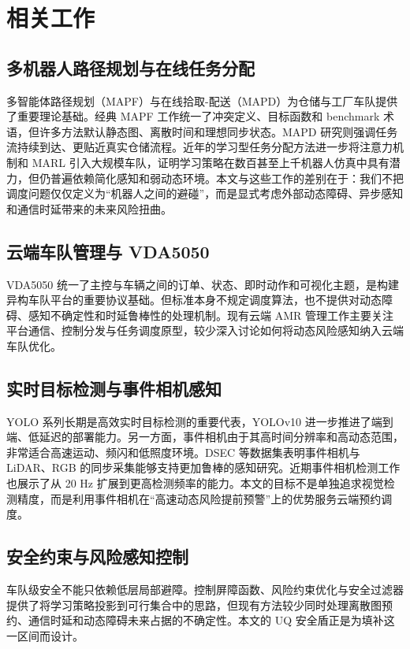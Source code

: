 \documentclass[UTF8,twocolumn,10pt]{ctexart}
\begin{document}
\section{相关工作}

\subsection{多机器人路径规划与在线任务分配}

多智能体路径规划（MAPF）与在线拾取-配送（MAPD）为仓储与工厂车队提供了重要理论基础。经典 MAPF 工作统一了冲突定义、目标函数和 benchmark 术语，但许多方法默认静态图、离散时间和理想同步状态。MAPD 研究则强调任务流持续到达、更贴近真实仓储流程。近年的学习型任务分配方法进一步将注意力机制和 MARL 引入大规模车队，证明学习策略在数百甚至上千机器人仿真中具有潜力，但仍普遍依赖简化感知和弱动态环境。本文与这些工作的差别在于：我们不把调度问题仅仅定义为“机器人之间的避碰”，而是显式考虑外部动态障碍、异步感知和通信时延带来的未来风险扭曲。

\subsection{云端车队管理与 VDA5050}

VDA5050 统一了主控与车辆之间的订单、状态、即时动作和可视化主题，是构建异构车队平台的重要协议基础。但标准本身不规定调度算法，也不提供对动态障碍、感知不确定性和时延鲁棒性的处理机制。现有云端 AMR 管理工作主要关注平台通信、控制分发与任务调度原型，较少深入讨论如何将动态风险感知纳入云端车队优化。

\subsection{实时目标检测与事件相机感知}

YOLO 系列长期是高效实时目标检测的重要代表，YOLOv10 进一步推进了端到端、低延迟的部署能力。另一方面，事件相机由于其高时间分辨率和高动态范围，非常适合高速运动、频闪和低照度环境。DSEC 等数据集表明事件相机与 LiDAR、RGB 的同步采集能够支持更加鲁棒的感知研究。近期事件相机检测工作也展示了从 20 Hz 扩展到更高检测频率的能力。本文的目标不是单独追求视觉检测精度，而是利用事件相机在“高速动态风险提前预警”上的优势服务云端预约调度。

\subsection{安全约束与风险感知控制}

车队级安全不能只依赖低层局部避障。控制屏障函数、风险约束优化与安全过滤器提供了将学习策略投影到可行集合中的思路，但现有方法较少同时处理离散图预约、通信时延和动态障碍未来占据的不确定性。本文的 UQ 安全盾正是为填补这一区间而设计。
\end{document}
